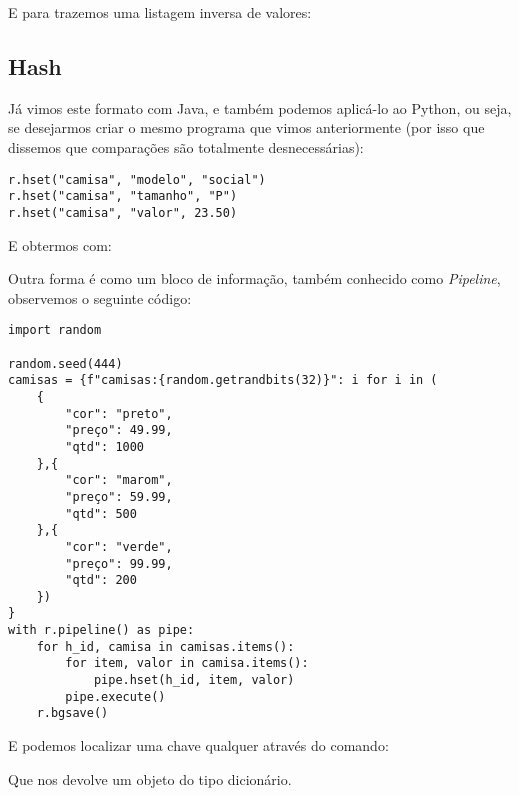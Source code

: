 E para trazemos uma listagem inversa de valores: \\

\subsection{Hash}
Já vimos este formato com Java, e também podemos aplicá-lo ao Python, ou seja, se desejarmos criar o mesmo programa que vimos anteriormente (por isso que dissemos que comparações são totalmente desnecessárias):
\begin{lstlisting}[]
r.hset("camisa", "modelo", "social")
r.hset("camisa", "tamanho", "P")
r.hset("camisa", "valor", 23.50)
\end{lstlisting}

E obtermos com: \\

Outra forma é como um bloco de informação, também conhecido como \textit{Pipeline}, observemos o seguinte código:
\begin{lstlisting}[]
import random

random.seed(444)
camisas = {f"camisas:{random.getrandbits(32)}": i for i in (
	{
		"cor": "preto",
		"preço": 49.99,
		"qtd": 1000
	},{
		"cor": "marom",
		"preço": 59.99,
		"qtd": 500
	},{
		"cor": "verde",
		"preço": 99.99,
		"qtd": 200
	})
}
with r.pipeline() as pipe:
	for h_id, camisa in camisas.items():
		for item, valor in camisa.items():
			pipe.hset(h_id, item, valor)
		pipe.execute()
	r.bgsave()
\end{lstlisting}

E podemos localizar uma chave qualquer através do comando:

Que nos devolve um objeto do tipo dicionário.
